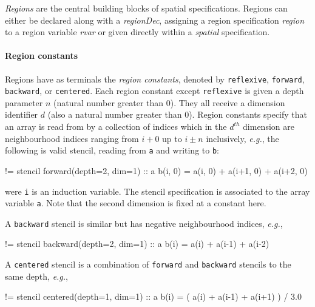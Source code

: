 \documentclass[9pt]{sigplanconf}
\newcounter{block}
\theoremstyle{definition}
\newcommand{\eg}{\emph{e.g.}}
\newcommand{\nonterm}[1]{\textit{#1}}
\newcommand{\term}[1]{\texttt{#1}}
\begin{document}
\emph{Regions} are the central building blocks of spatial
specifications. Regions can either be declared along with a
\nonterm{regionDec}, assigning a region specification \nonterm{region} to
a region variable \nonterm{rvar} or given directly within a
\nonterm{spatial} specification.

\paragraph{Region constants}

Regions have as terminals the \emph{region constants}, denoted by
\term{reflexive}, \term{forward}, \term{backward}, or \term{centered}. Each
region constant except \term{reflexive} is given a depth parameter $n$ (natural
number greater than 0). They all receive a dimension identifier $d$ (also a
natural number greater than 0). Region constants specify that an array is read
from by a collection of indices which in the $d^{th}$ dimension are
neighbourhood indices ranging from $i + 0$ up to $i \pm n$ inclusively,
\eg{}, the following is valid stencil, reading from \term{a} and writing to
\term{b}:
\begin{ExmVerbatim}
!= stencil forward(depth=2, dim=1) :: a
b(i, 0) = a(i, 0) + a(i+1, 0) + a(i+2, 0)
\end{ExmVerbatim}
were \texttt{i} is an induction variable.  The stencil specification
is associated to the array variable \texttt{a}. Note that the second
dimension is fixed at a constant here.

A \term{backward} stencil
is similar but has negative neighbourhood indices, \eg{},
%
\begin{ExmVerbatim}
!= stencil backward(depth=2, dim=1) :: a
b(i) = a(i) + a(i-1) + a(i-2)
\end{ExmVerbatim}
%
A \texttt{centered} stencil is a combination of \texttt{forward}
and \texttt{backward} stencils to the same depth, \eg{},
\begin{ExmVerbatim}
!= stencil centered(depth=1, dim=1) :: a
b(i) = ( a(i) + a(i-1) + a(i+1) ) / 3.0
\end{ExmVerbatim}
\end{document}
